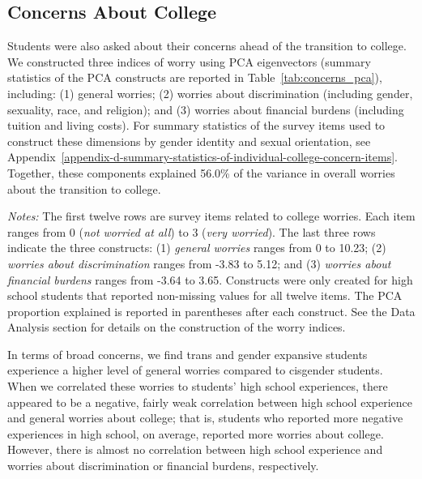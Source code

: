 \subsection{Concerns About College}\label{concerns-about-college}

Students were also asked about their concerns ahead of the transition to
college. We constructed three indices of worry using PCA eigenvectors
(summary statistics of the PCA constructs are reported in Table~\ref{tab:concerns_pca}),
including: (1) general worries; (2) worries about discrimination
(including gender, sexuality, race, and religion); and (3) worries about
financial burdens (including tuition and living costs). For summary
statistics of the survey items used to construct these dimensions by
gender identity and sexual orientation, see Appendix~\ref{appendix-d-summary-statistics-of-individual-college-concern-items}. Together, these
components explained 56.0\% of the variance in overall worries about the
transition to college.

\begin{table}[htbp]
\centering
\caption{College Concern Items and Results from Principal Component Analysis (PCA)}
\label{tab:concerns_pca}

\medskip
\begin{minipage}{\linewidth}
\noindent\footnotesize\textit{Notes:} The first twelve rows are survey items related to college
worries. Each item ranges from 0 (\emph{not worried at all}) to 3 (\emph{very
worried}). The last three rows indicate the three constructs: (1)
\emph{general worries} ranges from 0 to 10.23; (2) \emph{worries about
discrimination} ranges from -3.83 to 5.12; and (3) \emph{worries about
financial burdens} ranges from -3.64 to 3.65. Constructs were only
created for high school students that reported non-missing values for
all twelve items. The PCA proportion explained is reported in
parentheses after each construct. See the Data Analysis section for
details on the construction of the worry indices.
\end{minipage}
\end{table}

In terms of broad concerns, we find trans and gender expansive students
experience a higher level of general worries compared to cisgender
students. When we correlated these worries to students' high school
experiences, there appeared to be a negative, fairly weak correlation
between high school experience and general worries about college; that
is, students who reported more negative experiences in high school, on
average, reported more worries about college. However, there is almost
no correlation between high school experience and worries about
discrimination or financial burdens, respectively.


